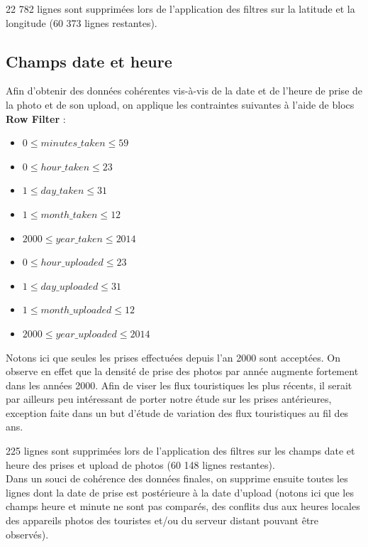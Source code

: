 22 782 lignes sont supprimées lors de l'application des filtres sur la latitude et la longitude (60 373 lignes restantes).


\subsection{Champs date et heure}
Afin d'obtenir des données cohérentes vis-à-vis de la date et de l'heure de prise de la photo et de son upload, on applique les contraintes suivantes à l'aide de blocs \textbf{Row Filter} :
\begin{itemize}
    \item $ 0 \leq minutes\_taken \leq 59 $
    \item $ 0 \leq hour\_taken \leq 23 $
    \item $ 1 \leq day\_taken \leq 31 $
    \item $ 1 \leq month\_taken \leq 12 $
    \item $ 2000 \leq year\_taken \leq 2014 $\\

    \item $ 0 \leq hour\_uploaded \leq 23 $
    \item $ 1 \leq day\_uploaded \leq 31 $
    \item $ 1 \leq month\_uploaded \leq 12 $
    \item $ 2000 \leq year\_uploaded \leq 2014 $\\
\end{itemize}

Notons ici que seules les prises effectuées depuis l'an 2000 sont acceptées. On observe en effet que la densité de prise des photos par année augmente fortement dans les années 2000.
Afin de viser les flux touristiques les plus récents, il serait par ailleurs peu intéressant de porter notre étude sur les prises antérieures, exception faite dans un but d'étude de variation des flux touristiques au fil des ans.

225 lignes sont supprimées lors de l'application des filtres sur les champs date et heure des prises et upload de photos (60 148 lignes restantes).\\

Dans un souci de cohérence des données finales, on supprime ensuite toutes les lignes dont la date de prise est postérieure à la date d'upload (notons ici que les champs heure et minute ne sont pas comparés, des conflits dus aux heures locales des appareils photos des touristes et/ou du serveur distant pouvant être observés).

